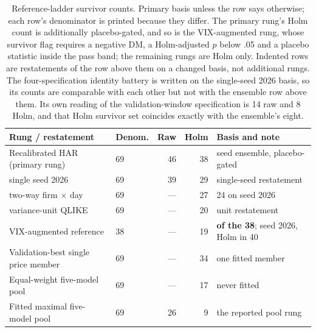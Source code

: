 \begin{table}[htbp]
\centering
\caption[Reference-ladder survivor counts by rung]{Reference-ladder
survivor counts. Primary basis unless the row says otherwise; each row's
denominator is printed because they differ. The primary rung's Holm
count is additionally placebo-gated, and so is the VIX-augmented rung, whose
survivor flag requires a negative DM, a Holm-adjusted $p$ below .05 and a
placebo statistic inside the pass band; the remaining rungs are Holm only. %
Indented rows are restatements of the row above them on a changed basis,
not additional rungs. The four-specification identity battery is written
on the single-seed 2026 basis, so its counts are comparable with each
other but not with the ensemble row above them. Its own reading of the
validation-window specification is 14 raw and 8 Holm, and that Holm
survivor set coincides exactly with the ensemble's eight.}
\label{tab:app-ladder}
\singlespacing\small
\setlength{\tabcolsep}{4pt}
\begin{tabular}{@{}llrrl@{}}
\toprule
Rung / restatement & Denom. & Raw & Holm & Basis and note \\
\midrule
Recalibrated HAR (primary rung)      & 69 & 46 & 38 & seed ensemble, placebo-gated \\ %
\quad single seed 2026               & 69 & 39 & 29 & single-seed restatement \\ %
\quad two-way firm $\times$ day      & 69 & --- & 27 & 24 on seed 2026 \\ %
\quad variance-unit QLIKE            & 69 & --- & 20 & unit restatement \\ %
VIX-augmented reference              & 38 & --- & 19 & \textbf{of the 38}; seed 2026, Holm in 40 \\ %
\midrule
Validation-best single price member  & 69 & --- & 34 & one fitted member \\ %
Equal-weight five-model pool         & 69 & --- & 17 & never fitted \\ %
Fitted maximal five-model pool       & 69 & 26 & 9  & the reported pool rung \\ %

\end{tabular}
\end{table}

